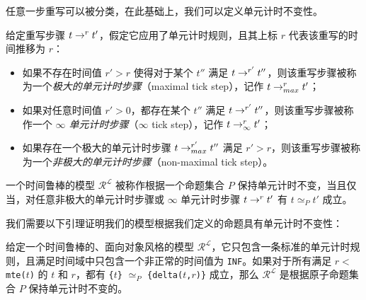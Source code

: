 任意一步重写可以被分类，在此基础上，我们可以定义单元计时不变性。
\begin{definition}
给定重写步骤 $t\mathrel{\rightarrow^{r}_{}}t'$，假定它应用了单元计时规则，且其上标 $r$ 代表该重写的时间推移为 $r$：
\begin{itemize}
\item 
如果不存在时间值 $r'>r$ 使得对于某个 $t''$ 满足 $t\mathrel{\rightarrow^{r'}_{}}t''$，则该重写步骤被称为一个\emph{极大的单元计时步骤}（maximal tick step），记作 $t\mathrel{\rightarrow^{r}_{max}}t'$；

\item 
如果对任意时间值 $r'>0$，都存在某个 $t''$ 满足 $t\mathrel{\rightarrow^{r'}_{}}t''$，则该重写步骤被称作一个 \emph{$\infty$ 单元计时步骤}（$\infty$ tick step），记作 $t\mathrel{\rightarrow^{r}_{\infty}}t'$；

\item 
如果存在一个极大的单元计时步骤 $t\mathrel{\rightarrow^{r'}_{max}}t''$ 满足 $r'>r$，则该重写步骤被称为一个\emph{非极大的单元计时步骤}（non-maximal tick step）。
\end{itemize}
\end{definition}

\begin{definition}
一个时间鲁棒的模型 $\mathcal{R^L}$ 被称作根据一个命题集合 $P$ 保持单元计时不变，当且仅当，对任意非极大的单元计时步骤或 $\infty$ 单元计时步骤 $t\mathrel{\rightarrow^{r}_{}}t'$ 有 $t\simeq_P t'$ 成立。
\end{definition}

我们需要以下引理证明我们的模型根据我们定义的命题具有单元计时不变性：
\begin{lemma}
\label{l:tickinv}
给定一个时间鲁棒的、面向对象风格的模型 $\mathcal{R^L}$，它只包含一条标准的单元计时规则，且满足时间域中只包含一个非正常的时间值为 \verb|INF|。如果对于所有满足 $r<$ \verb|mte(|$t$\verb|)| 的 $t$ 和 $r$，都有 \verb|{|$t$\verb|}| $\simeq_P$ \verb|{delta(|$t$\verb|,|$r$\verb|)}| 成立，那么 $\mathcal{R^L}$ 是根据原子命题集合 $P$ 保持单元计时不变的。
\end{lemma}

\newcommand{\mteTask}[2]{\texttt{mteTask(}#1\texttt{,}#2\texttt{)}}
\newcommand{\deltaTask}[3]{\texttt{deltaTask(}#1\texttt{,}#2\texttt{,}#3\texttt{)}}
\newcommand{\mteIS}[1]{\texttt{mteIS(}#1\texttt{)}}
\newcommand{\deltaIS}[2]{\texttt{deltaIS(}#1\texttt{,}#2\texttt{)}}
\newcommand{\IntSrc}[3]{\texttt{<}#1\texttt{:IntSrc|val:}#2\texttt{,cycle:}#3\texttt{>}}
\newcommand{\mteIr}[1]{\texttt{mteIr(}#1\texttt{)}}
\newcommand{\mteS}[1]{\texttt{mte(}#1\texttt{)}}
\newcommand{\deltaS}[2]{\texttt{delta(}#1\texttt{,}#2\texttt{)}}
 
